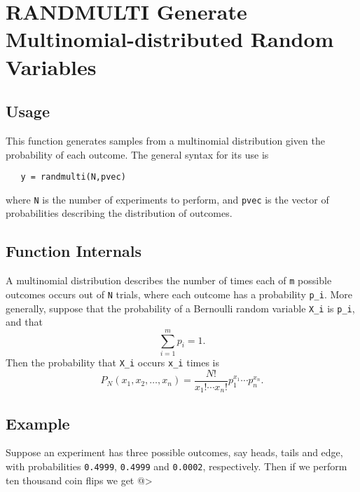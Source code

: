 \section{RANDMULTI Generate Multinomial-distributed Random Variables}

\subsection{Usage}

This function generates samples from a multinomial distribution
given the probability of each outcome.  The general syntax for
its use is
\begin{verbatim}
   y = randmulti(N,pvec)
\end{verbatim}
where \verb|N| is the number of experiments to perform, and \verb|pvec|
is the vector of probabilities describing the distribution of
outcomes.
\subsection{Function Internals}

A multinomial distribution describes the number of times each
of \verb|m| possible outcomes occurs out of \verb|N| trials, where each
outcome has a probability \verb|p_i|.  More generally, suppose that
the probability of a Bernoulli random variable \verb|X_i| is \verb|p_i|,
and that 
\[
   \sum_{i=1}^{m} p_i = 1.
\]
Then the probability that \verb|X_i| occurs \verb|x_i| times is
\[
   P_N(x_1,x_2,\ldots,x_n) = \frac{N!}{x_1!\cdots x_n!} p_1^{x_1}\cdots p_n^{x_n}.
\]
\subsection{Example}

Suppose an experiment has three possible outcomes, say heads,
tails and edge, with probabilities \verb|0.4999|, \verb|0.4999| and
\verb|0.0002|, respectively.  Then if we perform ten thousand coin
flips we get
@>
